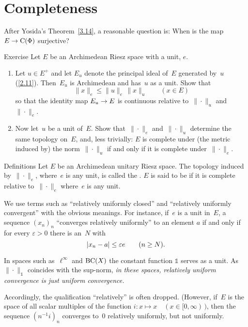\documentclass[main.tex]{subfiles}
\begin{document}
\section{Completeness}
After Yosida's Theorem~\ref{3.14},
a reasonable question is:
When is the map~$E\rightarrow \mathrm{C}(\Phi)$ surjective?
%
%
\begin{psec}{4.1}{Exercise}
Let $E$ be an Archimedean Riesz space with a unit, $e$.
\begin{enumerate}
\item \label{4.1-1}
Let $u\in E^+$ 
and let $E_u$ denote the principal ideal of~$E$ 
generated by~$u$ (\ref{2.11}). 
Then~$E_u$ is Archimedean and has~$u$ as a unit.
Show that
\begin{equation*}
\| x \|_e \leq \| u \|_e \, \| x \|_u \qquad (x\in E)
\end{equation*}
so that the identity map $E_u \rightarrow E$
is continuous relative to~$\|\cdot\|_u$ and~$\|\cdot \|_e$.
%
\item \label{4.1-2}
Now let~$u$ be a unit of~$E$.
Show that~$\|\cdot\|_e$ and~$\|\cdot\|_u$
determine the same topology on~$E$,
and, less trivially:
$E$ is complete under (the metric induced by) 
the norm~$\|\cdot\|_u$
if and only if it is complete under~$\|\cdot\|_e$.
\end{enumerate}
\end{psec}
%
%
\begin{psec}{4.2}{Definitions}
Let $E$ be an Archimedean unitary Riesz space.
The topology induced by~$\|\cdot\|_e$,
where~$e$ is any unit,
is called the .
$E$ is said to be
if it is complete relative to~$\|\cdot\|_e$
where~$e$ is any unit.

We use terms such as ``relatively uniformly closed''
and ``relatively uniformly convergent''
with the obvious meanings.
For instance,
if~$e$ is a unit in~$E$,
a sequence $(x_n)_n$
``converges relatively uniformly''
to an element $a$ 
if and only if for every $\varepsilon>0$
there is an~$N$ with
\begin{equation*}
|x_n - a| \leq \varepsilon e \qquad (n\geq N)\text{.}
\end{equation*}

In spaces such as~$\ell^\infty$
and $\mathrm{BC}(X)$
the constant function $\mathbb{1}$
serves as a unit.
As~$\|\cdot\|_\mathbb{1}$ coincides
with the sup-norm,
\emph{in these spaces,
relatively uniform convergence is just uniform convergence.}

Accordingly,
the qualification ``relatively'' is often dropped.
(However,
if~$E$ is the space of 
all scalar multiples of the function 
$i\colon x \mapsto x\quad (x\in [0,\infty)\,)$,
then the sequence $(n^{-1}i)_n$
converges to~$0$
relatively uniformly,
but not uniformly.
\end{psec}
\end{document}
